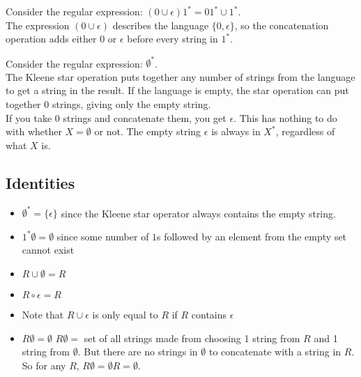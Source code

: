 \documentclass[11pt,a4paper]{article}
\begin{document}
\begin{example}
    Consider the regular expression: $(0\cup\epsilon)1^*=01^*\cup 1^*$. \\

    The expression $(0\cup\epsilon)$ describes the language $\{0,\epsilon\}$, so the concatenation operation adds either $0$ or $\epsilon$ before every string in $1^*$.
\end{example}

\begin{example}
    Consider the regular expression: $\emptyset^*$. \\

    The Kleene star operation puts together any number of strings from the language to get a string in the result. If the language is empty, the star operation can put together $0$ strings, giving only the empty string. \\

    If you take $0$ strings and concatenate them, you get $\epsilon$. This has nothing to do with whether $X=\emptyset$ or not. The empty string $\epsilon$ is always in $X^*$, regardless of what $X$ is.
\end{example}

\subsection{Identities}
\begin{itemize}
    \item $\emptyset^*=\{\epsilon\}$ since the Kleene star operator always contains the empty string.
    \item $1^*\emptyset=\emptyset$ since some number of $1$s followed by an element from the empty set cannot exist
    \item $R\cup\emptyset=R$
    \item $R\circ\epsilon=R$
    \item Note that $R\cup\epsilon$ is only equal to $R$ if $R$ contains $\epsilon$
    \item $R\emptyset=\emptyset$ 
    \subitem $R\emptyset=$ set of all strings made from choosing 1 string from $R$ and 1 string from $\emptyset$.
    \subitem But there are no strings in $\emptyset$ to concatenate with a string in $R$.
    \subitem  So for any $R$, $R\emptyset=\emptyset R=\emptyset$.
\end{itemize}
\end{document}
